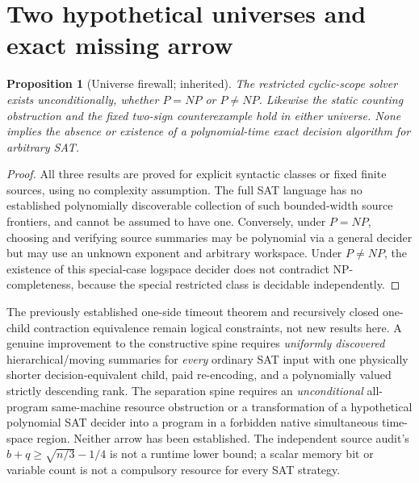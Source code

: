 \documentclass[11pt]{article}
\newtheorem{proposition}[theorem]{Proposition}
\begin{document}
\section{Two hypothetical universes and exact missing arrow}
\begin{proposition}[Universe firewall; inherited]
The restricted cyclic-scope solver exists unconditionally, whether $P=NP$ or $P\ne NP$. Likewise the static counting obstruction and the fixed two-sign counterexample hold in either universe. None implies the absence or existence of a polynomial-time exact decision algorithm for arbitrary SAT.
\end{proposition}
\begin{proof}
All three results are proved for explicit syntactic classes or fixed finite sources, using no complexity assumption. The full SAT language has no established polynomially discoverable collection of such bounded-width source frontiers, and cannot be assumed to have one. Conversely, under $P=NP$, choosing and verifying source summaries may be polynomial via a general decider but may use an unknown exponent and arbitrary workspace. Under $P\ne NP$, the existence of this special-case logspace decider does not contradict NP-completeness, because the special restricted class is decidable independently.
\end{proof}
The previously established one-side timeout theorem and recursively closed one-child contraction equivalence remain logical constraints, not new results here. A genuine improvement to the constructive spine requires \emph{uniformly discovered} hierarchical/moving summaries for \emph{every} ordinary SAT input with one physically shorter decision-equivalent child, paid re-encoding, and a polynomially valued strictly descending rank. The separation spine requires an \emph{unconditional} all-program same-machine resource obstruction or a transformation of a hypothetical polynomial SAT decider into a program in a forbidden native simultaneous time-space region. Neither arrow has been established. The independent source audit's $b+q\ge\sqrt{n/3}-1/4$ is not a runtime lower bound; a scalar memory bit or variable count is not a compulsory resource for every SAT strategy.
\end{document}
